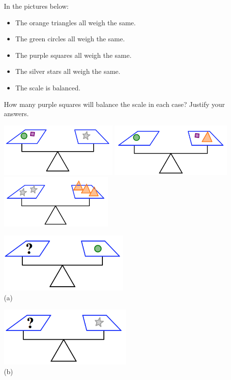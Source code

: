 \begin{problem}\label{prob: balance2}
In the pictures below:
\begin{itemize}
\item
The orange triangles all weigh the same.  
\item
The green circles all weigh the same.  
\item
The purple squares all weigh the same.  
\item
The silver stars all weigh the same.
\item
The scale is balanced.
\end{itemize}
How many purple squares will balance the scale in each case?  Justify your answers.
\begin{center}
\includegraphics[height=2.7cm]{balance2a}\quad
\includegraphics[height=2.7cm]{balance2b}
\includegraphics[height=2.7cm]{balance2c}

\bigskip
\bigskip

\includegraphics[height=3cm]{balance2d1}\\
(a)

\bigskip

\includegraphics[height=3cm]{balance2d2}\\
(b)
\bigskip



\end{center}
\end{problem}
